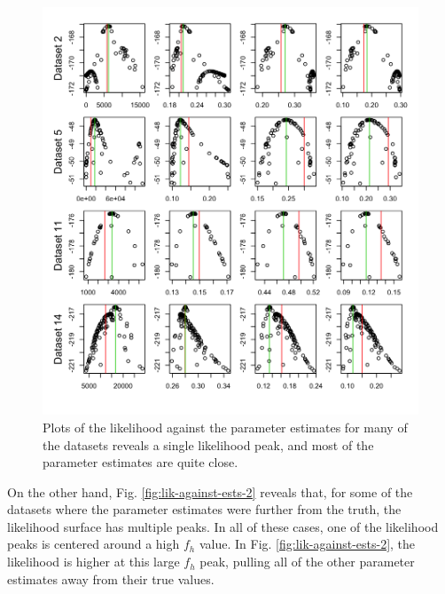 \documentclass[12pt,reqno,final,pdftex]{amsart}\usepackage[]{graphicx}\usepackage[]{color}
\newenvironment{knitrout}{}{} %
\theoremstyle{plain}
\numberwithin{equation}{part}
\begin{document}
\begin{knitrout}\scriptsize
{}\color{fgcolor}\begin{figure}

\includegraphics[width=\linewidth]{figure/lik-against-ests-1-1} \hfill{}

\caption[Plots of the likelihood against the parameter estimates for many of the datasets reveals a single likelihood peak, and most of the parameter estimates are quite close]{Plots of the likelihood against the parameter estimates for many of the datasets reveals a single likelihood peak, and most of the parameter estimates are quite close.}\label{fig:lik-against-ests-1}
\end{figure}


\end{knitrout}

On the other hand, Fig. \ref{fig:lik-against-ests-2} reveals that, for some of the datasets where the parameter estimates were further from the truth, the likelihood surface has multiple peaks.
In all of these cases, one of the likelihood peaks is centered around a high $f_h$ value.
In Fig. \ref{fig:lik-against-ests-2}, the likelihood is higher at this large $f_h$ peak, pulling all of the other parameter estimates away from their true values.
\end{document}
